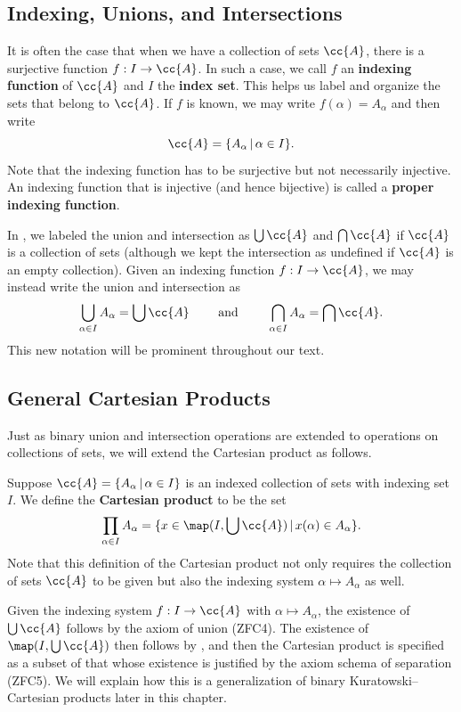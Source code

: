 \iffalse %
\subsection{Indexing, Unions, and Intersections}

It is often the case that when we have a collection of sets $\cc{A}$, there is a surjective function $f:I\rightarrow\cc{A}$.
In such a case, we call $f$ an \textbf{indexing function} of $\cc{A}$ and $I$ the \textbf{index set}. 
This helps us label and organize the sets that belong to $\cc{A}$. 
If $f$ is known, we may write $f(\alpha) = A_{\alpha}$ and then write
\[ \cc{A} = \{ A_{\alpha} \,|\, \alpha\in I \}. \]
Note that the indexing function has to be surjective but not necessarily injective.
An indexing function that is injective (and hence bijective) is called a \textbf{proper indexing function}. 

In , we labeled the union and intersection as $\bigcup\cc{A}$ and $\bigcap\cc{A}$ if $\cc{A}$ is a collection of sets (although we kept the intersection as undefined if $\cc{A}$ is an empty collection).
Given an indexing function $f:I\rightarrow\cc{A}$, we may instead write the union and intersection as
\[ \bigcup_{\alpha\in I} A_{\alpha} = \bigcup\cc{A} \qquad\text{ and }\qquad \bigcap_{\alpha\in I} A_{\alpha} = \bigcap\cc{A}. \]
This new notation will be prominent throughout our text. 



\subsection{General Cartesian Products}

Just as binary union and intersection operations are extended to operations on collections of sets, we will extend the Cartesian product as follows.

\begin{definition}
	Suppose $\cc{A} = \{ A_{\alpha} \,|\, \alpha\in I \}$ is an indexed collection of sets with indexing set $I$. 
	We define the \textbf{Cartesian product} to be the set
	\[ \prod_{\alpha\in I} A_{\alpha} = \{ x\in\map(I, \bigcup\cc{A}) \,|\, x(\alpha)\in A_{\alpha} \}. \]
	Note that this definition of the Cartesian product not only requires the collection of sets $\cc{A}$ to be given but also the indexing system $\alpha\mapsto A_{\alpha}$ as well.
\end{definition}

Given the indexing system $f:I\rightarrow\cc{A}$ with $\alpha\mapsto A_{\alpha}$, the existence of $\bigcup\cc{A}$ follows by the axiom of union (ZFC4). 
The existence of $\map(I, \bigcup\cc{A})$ then follows by , and then the Cartesian product is specified as a subset of that whose existence is justified by the axiom schema of separation (ZFC5).
We will explain how this is a generalization of binary Kuratowski--Cartesian products later in this chapter. 

